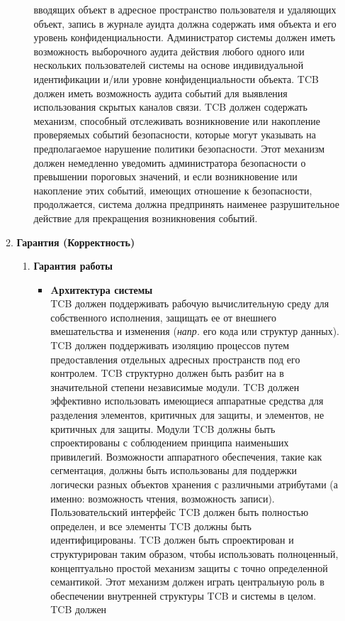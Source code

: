 \begin{enumerate}
\begin{enumerate}
\begin{enumerate}
			вводящих объект в адресное пространство пользователя и удаляющих объект, запись в журнале ауидта должна содержать имя объекта и его уровень конфиденциальности. Администратор 
			системы должен иметь возможность выборочного аудита действия любого одного или нескольких пользователей системы на основе индивидуальной идентификации и/или уровне конфиденциальности объекта.
			TCB должен иметь возможность аудита событий для выявления использования скрытых каналов связи. TCB должен содержать механизм, способный отслеживать возникновение или накопление 
			проверяемых событий безопасности, которые могут указывать на предполагаемое нарушение политики безопасности. Этот механизм должен немедленно уведомить администратора безопасности 
			о превышении пороговых значений, и если возникновение или накопление этих событий, имеющих отношение к безопасности, продолжается, система должна предпринять наименее 
			разрушительное действие для прекращения возникновения событий.
		\end{enumerate}
		\item{\textbf{Гарантия (Корректность)}}
		\begin{enumerate}
		\item{\textbf{Гарантия работы}}
			\begin{itemize}
				\item{\textbf{Aрхитектура системы}}\\
				TCB должен поддерживать рабочую вычислительную среду для собственного исполнения, защищать ее от внешнего вмешательства и изменения  (\textit{напр.} его кода или структур данных).
				TCB должен поддерживать изоляцию процессов путем предоставления отдельных адресных пространств под его контролем. TCB структурно должен быть разбит на в значительной степени
				независимые модули. TCB должен эффективно использовать имеющиеся аппаратные средства для разделения элементов, критичных для защиты, и элементов, не критичных для защиты.
				Модули TCB должны быть спроектированы с соблюдением принципа наименьших привилегий. Возможности аппаратного обеспечения, такие как сегментация, должны быть использованы 
				для поддержки логически разных объектов хранения с различными атрибутами (а именно: возможность чтения, возможность записи). Пользовательский интерфейс TCB должен быть полностью 
				определен, и все элементы TCB должны быть идентифицированы. TCB должен быть спроектирован и структурирован таким образом, чтобы использовать полноценный, концептуально
				простой механизм защиты с точно определенной семантикой. Этот механизм должен играть центральную роль в обеспечении внутренней структуры TCB и системы в целом. TCB должен 

\end{itemize}
\end{enumerate}
\end{enumerate}
\end{enumerate}
